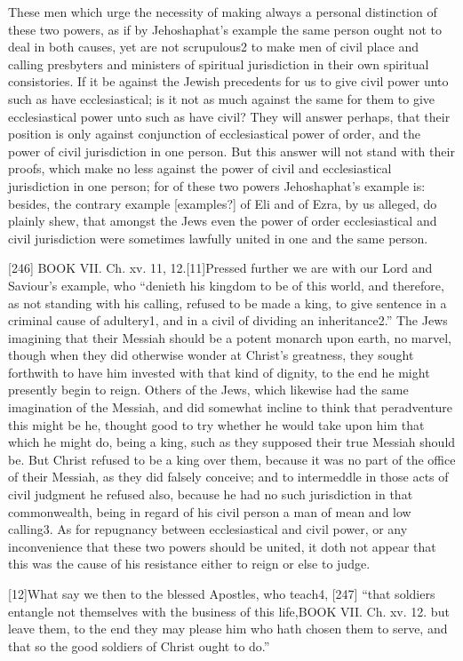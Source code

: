 These men which urge the necessity of making always a personal distinction of these two powers, as if by Jehoshaphat’s example the same person ought not to deal in both causes, yet are not scrupulous2 to make men of civil place and calling presbyters and ministers of spiritual jurisdiction in their own spiritual consistories. If it be against the Jewish precedents for us to give civil power unto such as have ecclesiastical; is it not as much against the same for them to give ecclesiastical power unto such as have civil? They will answer perhaps, that their position is only against conjunction of ecclesiastical power of order, and the power of civil jurisdiction in one person. But this answer will not stand with their proofs, which make no less against the power of civil and ecclesiastical jurisdiction in one person; for of these two powers Jehoshaphat’s example is: besides, the contrary example [examples?] of Eli and of Ezra, by us alleged, do plainly shew, that amongst the Jews even the power of order ecclesiastical and civil jurisdiction were sometimes lawfully united in one and the same person.

[246]
BOOK VII. Ch. xv. 11, 12.[11]Pressed further we are with our Lord and Saviour’s example, who “denieth his kingdom to be of this world, and therefore, as not standing with his calling, refused to be made a king, to give sentence in a criminal cause of adultery1, and in a civil of dividing an inheritance2.” The Jews imagining that their Messiah should be a potent monarch upon earth, no marvel, though when they did otherwise wonder at Christ’s greatness, they sought forthwith to have him invested with that kind of dignity, to the end he might presently begin to reign. Others of the Jews, which likewise had the same imagination of the Messiah, and did somewhat incline to think that peradventure this might be he, thought good to try whether he would take upon him that which he might do, being a king, such as they supposed their true Messiah should be. But Christ refused to be a king over them, because it was no part of the office of their Messiah, as they did falsely conceive; and to intermeddle in those acts of civil judgment he refused also, because he had no such jurisdiction in that commonwealth, being in regard of his civil person a man of mean and low calling3. As for repugnancy between ecclesiastical and civil power, or any inconvenience that these two powers should be united, it doth not appear that this was the cause of his resistance either to reign or else to judge.

[12]What say we then to the blessed Apostles, who teach4, [247] “that soldiers entangle not themselves with the business of this life,BOOK VII. Ch. xv. 12. but leave them, to the end they may please him who hath chosen them to serve, and that so the good soldiers of Christ ought to do.”

